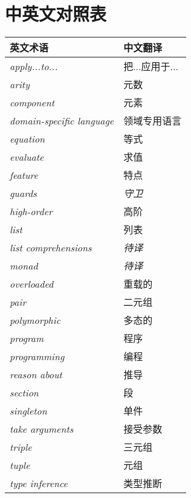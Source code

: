 \chapter*{中英文对照表}

\begin{table}[htbp]
\label{tab:threesome}
\centering
\begin{tabular}{ll}
\hline
英文术语 & 中文翻译 \\
\hline
\textit{apply...to...} & 把...应用于...\\
\textit{arity} & 元数 \\
\textit{component} & 元素 \\
\textit{domain-specific language} & 领域专用语言 \\
\textit{equation} & 等式 \\
\textit{evaluate} & 求值 \\
\textit{feature} & 特点 \\
\textit{guards} & \textit{守卫} \\
\textit{high-order} & 高阶 \\
\textit{list} & 列表 \\
\textit{list comprehensions} & \textit{待译}\\
\textit{monad} & \textit{待译} \\
\textit{overloaded} & 重载的 \\
\textit{pair} & 二元组 \\
\textit{polymorphic} & 多态的 \\
\textit{program} & 程序 \\
\textit{programming} & 编程 \\
\textit{reason about} & 推导 \\
\textit{section} & 段 \\
\textit{singleton} & 单件 \\
\textit{take arguments} & 接受参数 \\
\textit{triple} & 三元组 \\
\textit{tuple} & 元组 \\
\textit{type inference} & 类型推断 \\

\hline
\end{tabular}
\end{table}

